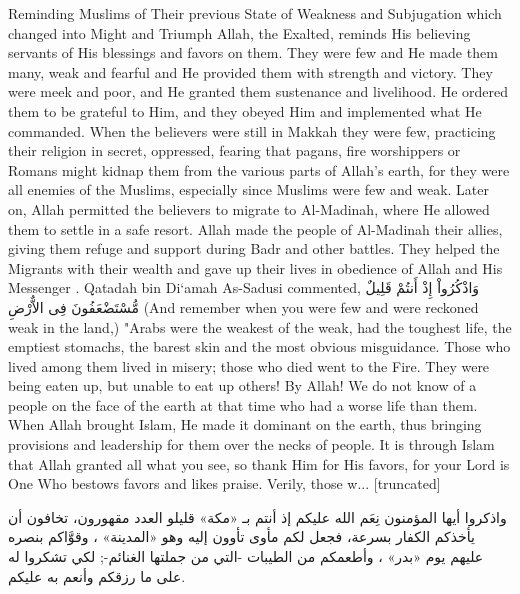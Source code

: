 \documentclass[11pt,a4paper,openany]{book}
\let\textAR\textarabic
\begin{document}
\begin{tafsirbox}
Reminding Muslims of Their previous State of Weakness and Subjugation which changed into Might and Triumph Allah, the Exalted, reminds His believing servants of His blessings and favors on them. They were few and He made them many, weak and fearful and He provided them with strength and victory. They were meek and poor, and He granted them sustenance and livelihood. He ordered them to be grateful to Him, and they obeyed Him and implemented what He commanded. When the believers were still in Makkah they were few, practicing their religion in secret, oppressed, fearing that pagans, fire worshippers or Romans might kidnap them from the various parts of Allah's earth, for they were all enemies of the Muslims, especially since Muslims were few and weak. Later on, Allah permitted the believers to migrate to Al-Madinah, where He allowed them to settle in a safe resort. Allah made the people of Al-Madinah their allies, giving them refuge and support during Badr and other battles. They helped the Migrants with their wealth and gave up their lives in obedience of Allah and His Messenger . Qatadah bin Di`amah As-Sadusi commented, \textAR{وَاذْكُرُواْ} \textAR{إِذْ} \textAR{أَنتُمْ} \textAR{قَلِيلٌ} \textAR{مُّسْتَضْعَفُونَ} \textAR{فِى} \textAR{الاٌّرْضِ} (And remember when you were few and were reckoned weak in the land,) "Arabs were the weakest of the weak, had the toughest life, the emptiest stomachs, the barest skin and the most obvious misguidance. Those who lived among them lived in misery; those who died went to the Fire. They were being eaten up, but unable to eat up others! By Allah! We do not know of a people on the face of the earth at that time who had a worse life than them. When Allah brought Islam, He made it dominant on the earth, thus bringing provisions and leadership for them over the necks of people. It is through Islam that Allah granted all what you see, so thank Him for His favors, for your Lord is One Who bestows favors and likes praise. Verily, those w... [truncated]
\end{tafsirbox}


\begin{muyassarbox}
\textAR{واذكروا أيها المؤمنون نِعَم الله عليكم إذ أنتم بـ «مكة» قليلو العدد مقهورون، تخافون أن يأخذكم الكفار بسرعة، فجعل لكم مأوى تأوون إليه وهو «المدينة» ، وقوَّاكم بنصره عليهم يوم «بدر» ، وأطعمكم من الطيبات -التي من جملتها الغنائم-; لكي تشكروا له على ما رزقكم وأنعم به عليكم.}
\end{muyassarbox}
\end{document}
